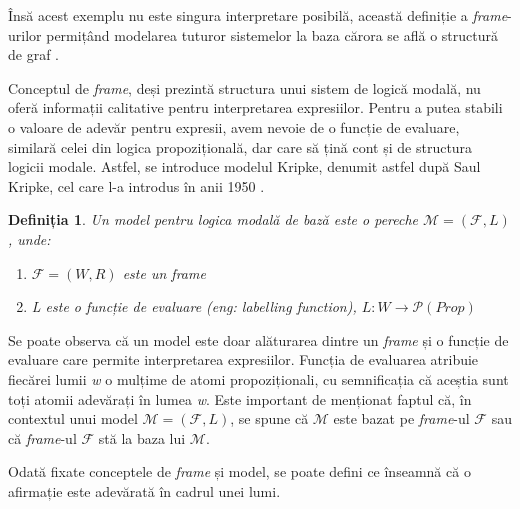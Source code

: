 \documentclass[12pt, openany]{book}
\newtheorem{definition}{Definiția}[chapter] %
\newcommand{\myenglishterm}[1]{(\textit{eng: #1})}
\begin{document}
            \par{}
                Însă acest exemplu nu este singura interpretare posibilă, această definiție a \textit{frame}-urilor 
                permițând modelarea tuturor sistemelor la baza cărora se află o structură de graf \cite{handbook_modal_logic}.

            \par{}
                Conceptul de \textit{frame}, deși prezintă structura unui sistem de logică modală, nu oferă informații 
                calitative pentru interpretarea expresiilor. Pentru a putea stabili o valoare de adevăr pentru expresii, 
                avem nevoie de o funcție de evaluare, similară celei din logica propozițională, dar care să țină cont și de
                structura logicii modale. Astfel, se introduce modelul Kripke, denumit astfel după Saul Kripke, cel care l-a 
                introdus în anii 1950 \cite{lecture_notes_hedin}.
            
            \begin{definition}
                Un model pentru logica modală de bază este o pereche $\mathcal{M} = (\mathcal{F}, L)$, unde:
                \begin{enumerate}
                    \item $\mathcal{F} = (W, R)$ este un \textit{frame}
                    \item L este o funcție de evaluare \myenglishterm{labelling function},
                    $L : W \rightarrow \mathcal{P}(Prop)$
                \end{enumerate}
            \end{definition}

            \par{}
                Se poate observa că un model este doar alăturarea dintre un \textit{frame} și o funcție de evaluare care 
                permite interpretarea expresiilor. Funcția de evaluarea atribuie fiecărei lumii \textit{w} o mulțime de atomi
                propoziționali, cu semnificația că aceștia sunt toți atomii adevărați în lumea \textit{w}. Este important
                de menționat faptul că, în contextul unui model $\mathcal{M} = (\mathcal{F}, L)$, se spune că $\mathcal{M}$ 
                este bazat pe \textit{frame}-ul $\mathcal{F}$ sau că \textit{frame}-ul $\mathcal{F}$ stă la baza lui 
                $\mathcal{M}$.

            \par{}
                Odată fixate conceptele de \textit{frame} și model, se poate defini ce înseamnă că o afirmație este adevărată
                în cadrul unei lumi.
            
\end{document}
